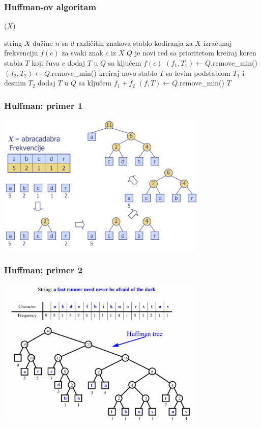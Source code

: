 \documentclass[compress]{beamer}
\begin{document}
\begin{frame}
  \frametitle{Huffman-ov algoritam}
  ($X$)
  \begin{algorithmic}
    \REQUIRE string $X$ dužine $n$ sa $d$ različitih znakova
    \ENSURE stablo kodiranja za $X$
    \STATE izračunaj frekvenciju $f(c)$ za svaki znak $c$ iz $X$
    \STATE $Q$ je novi red sa prioritetom
      \STATE kreiraj koren stabla $T$ koji čuva $c$
      \STATE dodaj $T$ u $Q$ sa ključem $f(c)$
    \ENDFOR
      \STATE $(f_{1},T_{1}) \leftarrow Q$.remove\_min()
      \STATE $(f_{2},T_{2}) \leftarrow Q$.remove\_min()
      \STATE kreiraj novo stablo $T$ sa levim podstablom $T_{1}$ i desnim $T_{2}$
      \STATE dodaj $T$ u $Q$ sa ključem $f_{1} + f_{2}$
    \ENDWHILE
    \STATE $(f,T) \leftarrow Q$.remove\_min()
    \RETURN $T$
  \end{algorithmic}    
\end{frame}

\begin{frame}[fragile]
  \frametitle{Huffman: primer 1}
  \begin{center}
    \includegraphics[width=10cm]{asp-13-pic14.png}
  \end{center}
\end{frame}

\begin{frame}[fragile]
  \frametitle{Huffman: primer 2}
  \begin{center}
    \includegraphics[width=10cm]{asp-13-pic15.png}
  \end{center}
\end{frame}
\end{document}
